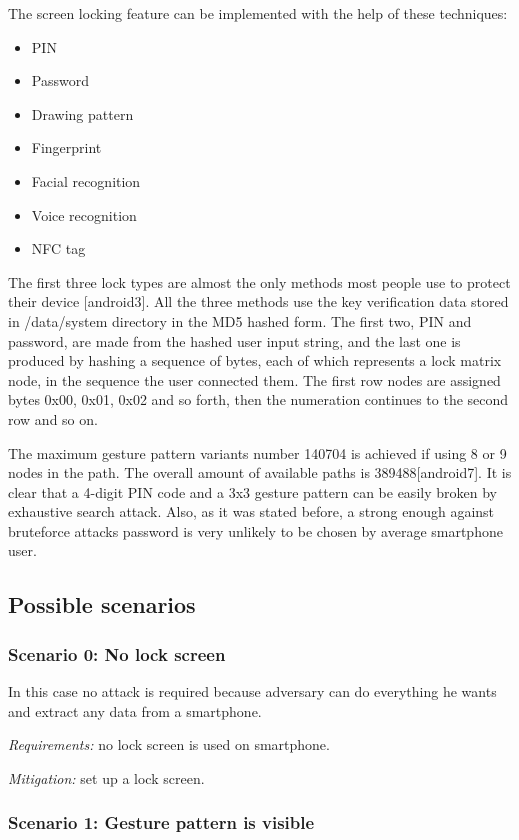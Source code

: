 The screen locking feature can be implemented with the help of these techniques:

\begin{itemize}
\item{}
PIN
\item{}
Password
\item{}
Drawing pattern
\item{}
Fingerprint
\item{}
Facial recognition
\item{}
Voice recognition
\item{}
NFC tag
\end{itemize}

The first three lock types are almost the only methods most people use to protect their device [android3]. All the three methods use the key verification data stored in /data/system directory in the MD5 hashed form. The first two, PIN and password, are made from the hashed user input string, and the last one is produced by hashing a sequence of bytes, each of which represents a lock matrix node, in the sequence the user connected them. The first row nodes are assigned bytes 0x00, 0x01, 0x02 and so forth, then the numeration continues to the second row and so on.

The maximum gesture pattern variants number 140704 is achieved if using 8 or 9 nodes in the path. The overall amount of available paths is 389488[android7]. It is clear that a 4-digit PIN code and a 3x3 gesture pattern can be easily broken by exhaustive search attack. Also, as it was stated before, a strong enough against bruteforce attacks password is very unlikely to be chosen by average smartphone user.


\subsection{Possible scenarios}

\subsubsection{Scenario 0: No lock screen}
In this case no attack is required because adversary can do everything he wants and extract any data from a smartphone.


\textsl{Requirements:} no lock screen is used on smartphone.

\textsl{Mitigation:} set up a lock screen.

\subsubsection{Scenario 1: Gesture pattern is visible}

